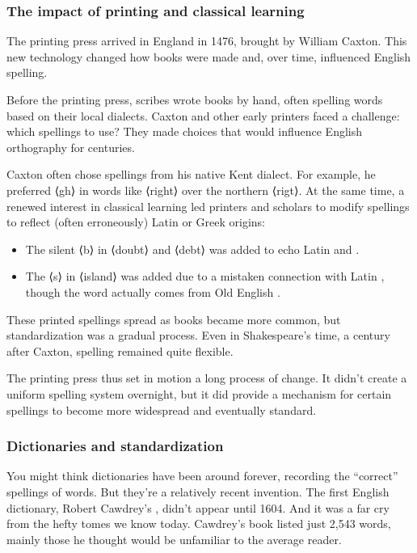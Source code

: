 \subsubsection{The impact of printing and classical learning}

The printing press arrived in England in 1476, brought by William Caxton. This new technology changed how books were made and, over time, influenced English spelling.

Before the printing press, scribes wrote books by hand, often spelling words based on their local dialects. Caxton and other early printers faced a challenge: which spellings to use? They made choices that would influence English orthography for centuries.

Caxton often chose spellings from his native Kent dialect. For example, he preferred ⟨gh⟩ in words like ⟨right⟩ over the northern ⟨rigt⟩. At the same time, a renewed interest in classical learning led printers and scholars to modify spellings to reflect (often erroneously) Latin or Greek origins:

   \begin{itemize}[noitemsep]
     \item The silent ⟨b⟩ in ⟨doubt⟩ and ⟨debt⟩ was added to echo Latin  and .
     \item The ⟨s⟩ in ⟨island⟩ was added due to a mistaken connection with Latin , though the word actually comes from Old English .
   \end{itemize}

These printed spellings spread as books became more common, but standardization was a gradual process. Even in Shakespeare's time, a century after Caxton, spelling remained quite flexible.

The printing press thus set in motion a long process of change. It didn't create a uniform spelling system overnight, but it did provide a mechanism for certain spellings to become more widespread and eventually standard.

\subsubsection{Dictionaries and standardization}

You might think dictionaries have been around forever, recording the ``correct'' spellings of words. But they're a relatively recent invention. The first English dictionary, Robert Cawdrey's , didn't appear until 1604. And it was a far cry from the hefty tomes we know today. Cawdrey's book listed just 2,543 words, mainly those he thought would be unfamiliar to the average reader.

